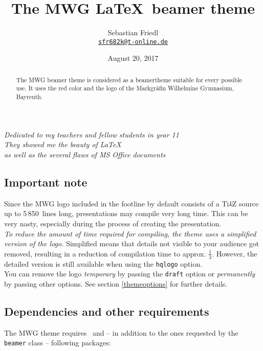 \documentclass[11pt]{ltxdoc}
\title{The MWG \LaTeX\ beamer theme}
\author{Sebastian Friedl \\ \href{mailto:sfr682k@t-online.de}{\texttt{sfr682k@t-online.de}}}
\date{August 20, 2017}
\begin{document}
	\maketitle
	\thispagestyle{empty}
	

	\begin{center} \itshape
		Dedicated to my teachers and fellow students in year 11 \\[1.25\smallskipamount]
		They showed me the beauty of \LaTeX \\
		as well as the several flaws of MS Office documents
	\end{center}
	
	\medskip
	\begin{abstract}
		\hspace{-1.5em}%
		The MWG beamer theme is considered as a beamertheme suitable for every possible use. It uses the red color and the logo of the Markgräfin Wilhelmine Gymnasium, Bayreuth.
	\end{abstract}
	

	\tableofcontents

	\clearpage
	
	\subsection*{Important note}
	Since the MWG logo included in the footline by default consists of a Ti\textit{k}Z source up to 5\,850~lines long, presentations may compile very long time. This can be very nasty, especially during the process of creating the presentation. \\
	\emph{To reduce the amount of time required for compiling, the theme uses a simplified version of the logo.} Simplified means that details not visible to your audience got removed, resulting in a reduction of compilation time to approx. $\tfrac13$. However, the detailed version is still available when using the \texttt{hqlogo} option. \\
	You can remove the logo \emph{temporary} by passing the \texttt{draft} option or \emph{permanently} by passing other options. See section \ref{themeoptions} for further details.
	
	
	\subsection*{Dependencies and other requirements}
	The MWG theme requires \LaTeXe\ and -- in addition to the ones requested by the \texttt{beamer} class -- following packages:
	
\end{document}
